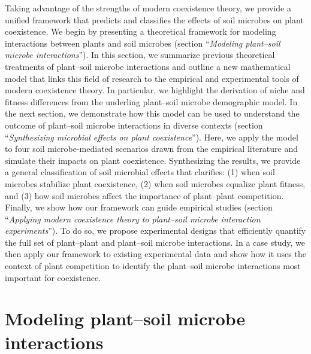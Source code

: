 Taking advantage of the strengths of modern coexistence theory, we provide a unified framework that predicts and classifies the effects of soil microbes on plant coexistence.
We begin by presenting a theoretical framework for modeling interactions between plants and soil microbes (section ``\textit{Modeling plant--soil microbe interactions}''). In this section, we summarize previous theoretical treatments of plant--soil microbe interactions and outline a new mathematical model that links this field of research to the empirical and experimental tools of modern coexistence theory. In particular, we highlight the derivation of niche and fitness differences from the underling plant--soil microbe demographic model.
In the next section, we demonstrate how this model can be used to understand the outcome of plant--soil microbe interactions in diverse contexts (section ``\textit{Synthesizing microbial effects on plant coexistence}''). Here, we apply the model to four soil microbe-mediated scenarios drawn from the empirical literature and simulate their impacts on plant coexistence.
Synthesizing the results, we provide a general classification of soil microbial effects that clarifies: (1) when soil microbes stabilize plant coexistence, (2) when soil microbes equalize plant fitness, and (3) how soil microbes affect the importance of plant--plant competition.
Finally, we show how our framework can guide empirical studies (section ``\textit{Applying modern coexistence theory to plant--soil microbe interaction experiments}''). To do so, we propose experimental designs that efficiently quantify the full set of plant--plant and plant--soil microbe interactions. In a case study, we then apply our framework to existing experimental data and show how it uses the context of plant competition to identify the plant--soil microbe interactions most important for coexistence.
\par



\section{Modeling plant--soil microbe interactions}
